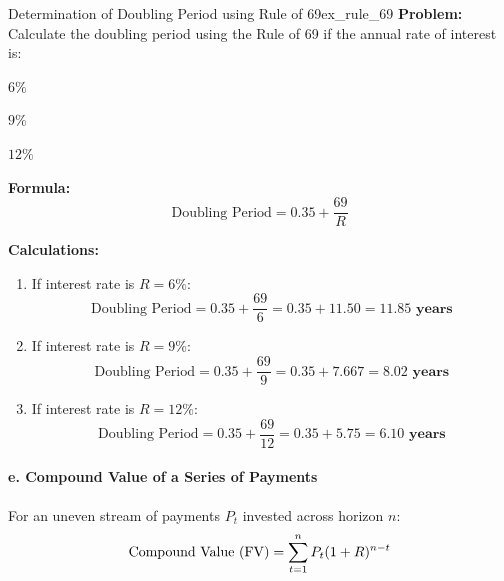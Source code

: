 \begin{example}{Determination of Doubling Period using Rule of 69}{ex_rule_69}
\textbf{Problem:}
Calculate the doubling period using the Rule of 69 if the annual rate of interest is:
\begin{enumerate*}[label=(\alph*), itemjoin=\qquad]
    \item $6\%$
    \item $9\%$
    \item $12\%$
\end{enumerate*}

\tcbline
\textbf{Formula:}
\begin{equation*}
    \text{Doubling Period} = 0.35 + \frac{69}{R}
\end{equation*}

\textbf{Calculations:}
\begin{enumerate}[leftmargin=*]
    \item If interest rate is $R = 6\%$:
    \begin{equation*}
        \text{Doubling Period} = 0.35 + \frac{69}{6} = 0.35 + 11.50 = \mathbf{11.85 \text{ years}}
    \end{equation*}

    \item If interest rate is $R = 9\%$:
    \begin{equation*}
        \text{Doubling Period} = 0.35 + \frac{69}{9} = 0.35 + 7.667 = \mathbf{8.02 \text{ years}}
    \end{equation*}

    \item If interest rate is $R = 12\%$:
    \begin{equation*}
        \text{Doubling Period} = 0.35 + \frac{69}{12} = 0.35 + 5.75 = \mathbf{6.10 \text{ years}}
    \end{equation*}
\end{enumerate}
\end{example}

\begin{formulabox}
\paragraph{e. Compound Value of a Series of Payments}
For an uneven stream of payments $P_t$ invested across horizon $n$:
\begin{equation}
    \text{Compound Value } (\operatorname{FV}) = \sum_{t=1}^{n} P_t (1 + R)^{n - t}
\end{equation}
\end{formulabox}

